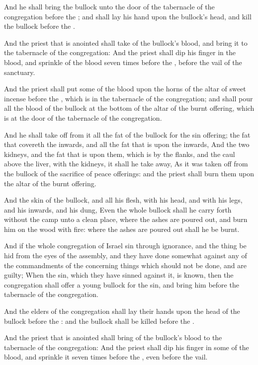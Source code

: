 \verse And he shall bring the bullock unto the door of the tabernacle of the congregation before the \LORD; and shall lay his hand upon the bullock's head, and kill the bullock before the \LORD.

\verse And the priest that is anointed shall take of the bullock's blood, and bring it to the tabernacle of the congregation: \verse And the priest shall dip his finger in the blood, and sprinkle of the blood seven times before the \LORD, before the vail of the sanctuary.

\verse And the priest shall put some of the blood upon the horns of the altar of sweet incense before the \LORD, which is in the tabernacle of the congregation; and shall pour all the blood of the bullock at the bottom of the altar of the burnt offering, which is at the door of the tabernacle of the congregation.

\verse And he shall take off from it all the fat of the bullock for the sin offering; the fat that covereth the inwards, and all the fat that is upon the inwards, \verse And the two kidneys, and the fat that is upon them, which is by the flanks, and the caul above the liver, with the kidneys, it shall he take away, \verse As it was taken off from the bullock of the sacrifice of peace offerings: and the priest shall burn them upon the altar of the burnt offering.

\verse And the skin of the bullock, and all his flesh, with his head, and with his legs, and his inwards, and his dung, \verse Even the whole bullock shall he carry forth without the camp unto a clean place, where the ashes are poured out, and burn him on the wood with fire: where the ashes are poured out shall he be burnt.

\verse And if the whole congregation of Israel sin through ignorance, and the thing be hid from the eyes of the assembly, and they have done somewhat against any of the commandments of the \LORD concerning things which should not be done, and are guilty; \verse When the sin, which they have sinned against it, is known, then the congregation shall offer a young bullock for the sin, and bring him before the tabernacle of the congregation.

\verse And the elders of the congregation shall lay their hands upon the head of the bullock before the \LORD: and the bullock shall be killed before the \LORD.

\verse And the priest that is anointed shall bring of the bullock's blood to the tabernacle of the congregation: \verse And the priest shall dip his finger in some of the blood, and sprinkle it seven times before the \LORD, even before the vail.

